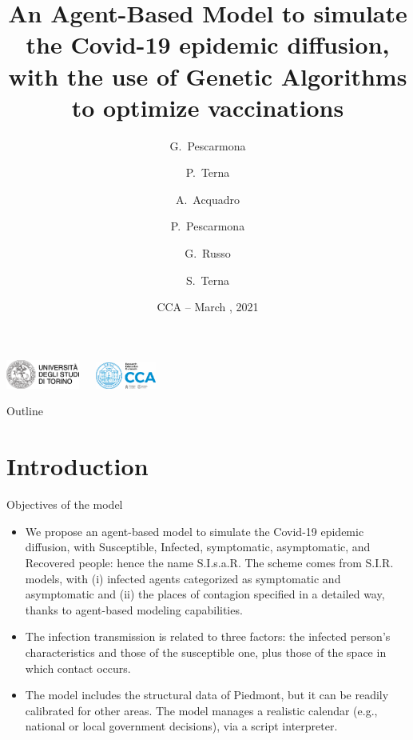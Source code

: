 \documentclass[8pt]{beamer}
\title[S.I.s.a.R. Model] %
{An Agent-Based Model to simulate the Covid-19 epidemic diffusion, with the use of Genetic Algorithms to optimize vaccinations}
\author[] %
{G.~Pescarmona\inst{1} \and P.~Terna\inst{2} \and A.~Acquadro\inst{1} \and P.~Pescarmona\inst{3} \and G.~Russo\inst{4}  
\and S.~Terna\inst{5}  }
\institute[] %
{
  \inst{1}%
 University of Torino, Italy
  \and
  \inst{2}%
  University of Torino, Italy, retired \& Fondazione Collegio Carlo Alberto, Honorary Fellow, Italy
 \and
  \inst{3}%
  University of Groningen, The Netherlands  
  \and
  \inst{4}%
  Centro Einaudi, Torino, Italy
  \and
  \inst{5}%
 tomorrowdata.io
  }
\date[] %
{CCA -- March \nth{29}, 2021}
\begin{document}
\begin{frame}

\includegraphics[width=0.18\textwidth]{logo_unito.png}~~~\includegraphics[width=0.15\textwidth]{CCA_Logo.png}

  \titlepage
\end{frame}

\begin{frame}{Outline}
  \tableofcontents
\end{frame}

\section{Introduction}

\begin{frame}{Objectives of the model}

  \begin{itemize}
  \item
We propose an agent-based model to simulate the Covid-19 epidemic diffusion, with Susceptible, Infected, symptomatic, asymptomatic, and Recovered people: hence the name S.I.s.a.R. The scheme comes from S.I.R. models, with (i) infected agents categorized as symptomatic and asymptomatic and (ii) the places of contagion specified in a detailed way, thanks to agent-based modeling capabilities. 

 \item
The infection transmission is related to three factors: the infected person's characteristics and those of the susceptible one, plus those of the space in which contact occurs.

 \item
The model includes the structural data of Piedmont, but it can be readily calibrated for other areas. The model manages a realistic calendar (e.g., national or local government decisions), via a script interpreter.  


 \end{itemize}
\end{frame}
\end{document}
